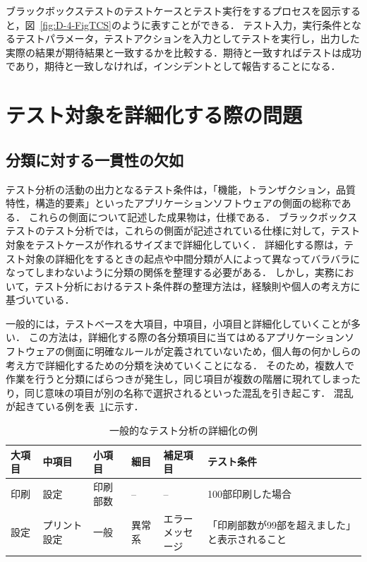 ブラックボックステストのテストケースとテスト実行をするプロセスを図示すると，図~\ref{fig:D-4-FigTCS}のように表すことができる．
テスト入力，実行条件となるテストパラメータ，テストアクションを入力としてテストを実行し，出力した実際の結果が期待結果と一致するかを比較する．期待と一致すればテストは成功であり，期待と一致しなければ，インシデントとして報告することになる．




\newpage
\section{テスト対象を詳細化する際の問題} \label{sec:2-2}
\subsection{分類に対する一貫性の欠如}
テスト分析の活動の出力となるテスト条件は，「機能，トランザクション，品質特性，構造的要素\cite{ISTQB}」といったアプリケーションソフトウェアの側面の総称である．
これらの側面について記述した成果物は，仕様である．
ブラックボックステストのテスト分析では，これらの側面が記述されている仕様に対して，テスト対象をテストケースが作れるサイズまで詳細化していく．
詳細化する際は，テスト対象の詳細化をするときの起点や中間分類が人によって異なってバラバラになってしまわないように分類の関係を整理する必要がある．
しかし，実務において，テスト分析におけるテスト条件群の整理方法は，経験則や個人の考え方に基づいている．

一般的には，テストベースを大項目，中項目，小項目と詳細化していくことが多い．
この方法は，詳細化する際の各分類項目に当てはめるアプリケーションソフトウェアの側面に明確なルールが定義されていないため，個人毎の何かしらの考え方で詳細化するための分類を決めていくことになる．
そのため，複数人で作業を行うと分類にばらつきが発生し，同じ項目が複数の階層に現れてしまったり，同じ意味の項目が別の名称で選択されるといった混乱を引き起こす．
混乱が起きている例を表~\ref{tab:analysissample}に示す．
\begin{table}[htbp]
  \centering
  \caption{一般的なテスト分析の詳細化の例}
    \begin{tabular}{|l|l|l|l|p{5em}|p{6em}|}
    \hline
    大項目   & 中項目   & 小項目   & 細目    & 補足項目  & テスト条件 \bigstrut\\
    \hline
    印刷    & 設定    & 印刷部数  & --    & --     & 100部印刷した場合 \bigstrut\\
    \hline
    設定    & プリント設定 & 一般    & 異常系   & \shortstack{エラー\\メッセージ} & 「印刷部数が99部を超えました」と表示されること \bigstrut\\
    \hline
    \end{tabular}%
  \label{tab:analysissample}%
\end{table}%

